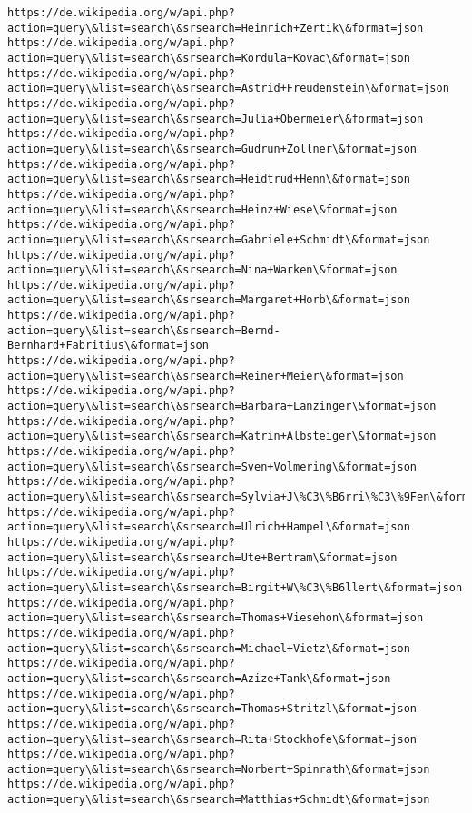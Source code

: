 \documentclass[11pt]{article}
\begin{document}
\begin{Verbatim}[commandchars=\\\{\}]
https://de.wikipedia.org/w/api.php?action=query\&list=search\&srsearch=Heinrich+Zertik\&format=json
https://de.wikipedia.org/w/api.php?action=query\&list=search\&srsearch=Kordula+Kovac\&format=json
https://de.wikipedia.org/w/api.php?action=query\&list=search\&srsearch=Astrid+Freudenstein\&format=json
https://de.wikipedia.org/w/api.php?action=query\&list=search\&srsearch=Julia+Obermeier\&format=json
https://de.wikipedia.org/w/api.php?action=query\&list=search\&srsearch=Gudrun+Zollner\&format=json
https://de.wikipedia.org/w/api.php?action=query\&list=search\&srsearch=Heidtrud+Henn\&format=json
https://de.wikipedia.org/w/api.php?action=query\&list=search\&srsearch=Heinz+Wiese\&format=json
https://de.wikipedia.org/w/api.php?action=query\&list=search\&srsearch=Gabriele+Schmidt\&format=json
https://de.wikipedia.org/w/api.php?action=query\&list=search\&srsearch=Nina+Warken\&format=json
https://de.wikipedia.org/w/api.php?action=query\&list=search\&srsearch=Margaret+Horb\&format=json
https://de.wikipedia.org/w/api.php?action=query\&list=search\&srsearch=Bernd-Bernhard+Fabritius\&format=json
https://de.wikipedia.org/w/api.php?action=query\&list=search\&srsearch=Reiner+Meier\&format=json
https://de.wikipedia.org/w/api.php?action=query\&list=search\&srsearch=Barbara+Lanzinger\&format=json
https://de.wikipedia.org/w/api.php?action=query\&list=search\&srsearch=Katrin+Albsteiger\&format=json
https://de.wikipedia.org/w/api.php?action=query\&list=search\&srsearch=Sven+Volmering\&format=json
https://de.wikipedia.org/w/api.php?action=query\&list=search\&srsearch=Sylvia+J\%C3\%B6rri\%C3\%9Fen\&format=json
https://de.wikipedia.org/w/api.php?action=query\&list=search\&srsearch=Ulrich+Hampel\&format=json
https://de.wikipedia.org/w/api.php?action=query\&list=search\&srsearch=Ute+Bertram\&format=json
https://de.wikipedia.org/w/api.php?action=query\&list=search\&srsearch=Birgit+W\%C3\%B6llert\&format=json
https://de.wikipedia.org/w/api.php?action=query\&list=search\&srsearch=Thomas+Viesehon\&format=json
https://de.wikipedia.org/w/api.php?action=query\&list=search\&srsearch=Michael+Vietz\&format=json
https://de.wikipedia.org/w/api.php?action=query\&list=search\&srsearch=Azize+Tank\&format=json
https://de.wikipedia.org/w/api.php?action=query\&list=search\&srsearch=Thomas+Stritzl\&format=json
https://de.wikipedia.org/w/api.php?action=query\&list=search\&srsearch=Rita+Stockhofe\&format=json
https://de.wikipedia.org/w/api.php?action=query\&list=search\&srsearch=Norbert+Spinrath\&format=json
https://de.wikipedia.org/w/api.php?action=query\&list=search\&srsearch=Matthias+Schmidt\&format=json

\end{Verbatim}
\end{document}
